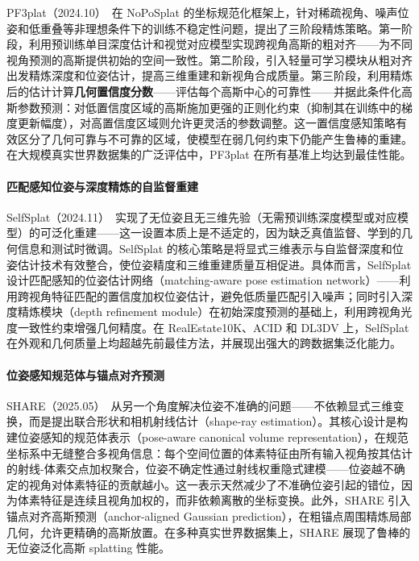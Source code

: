 PF3plat（2024.10）~\cite{2410_22128}在 NoPoSplat 的坐标规范化框架上，针对稀疏视角、噪声位姿和低重叠等非理想条件下的训练不稳定性问题，提出了三阶段精炼策略。第一阶段，利用预训练单目深度估计和视觉对应模型实现跨视角高斯的粗对齐——为不同视角预测的高斯提供初始的空间一致性。第二阶段，引入轻量可学习模块从粗对齐出发精炼深度和位姿估计，提高三维重建和新视角合成质量。第三阶段，利用精炼后的估计计算\textbf{几何置信度分数}——评估每个高斯中心的可靠性——并据此条件化高斯参数预测：对低置信度区域的高斯施加更强的正则化约束（抑制其在训练中的梯度更新幅度），对高置信度区域则允许更灵活的参数调整。这一置信度感知策略有效区分了几何可靠与不可靠的区域，使模型在弱几何约束下仍能产生鲁棒的重建。在大规模真实世界数据集的广泛评估中，PF3plat 在所有基准上均达到最佳性能。

\paragraph{匹配感知位姿与深度精炼的自监督重建}

SelfSplat（2024.11）~\cite{2411_17190}实现了无位姿且无三维先验（无需预训练深度模型或对应模型）的可泛化重建——这一设置本质上是不适定的，因为缺乏真值监督、学到的几何信息和测试时微调。SelfSplat 的核心策略是将显式三维表示与自监督深度和位姿估计技术有效整合，使位姿精度和三维重建质量互相促进。具体而言，SelfSplat 设计匹配感知的位姿估计网络（matching-aware pose estimation network）——利用跨视角特征匹配的置信度加权位姿估计，避免低质量匹配引入噪声；同时引入深度精炼模块（depth refinement module）在初始深度预测的基础上，利用跨视角光度一致性约束增强几何精度。在 RealEstate10K、ACID 和 DL3DV 上，SelfSplat 在外观和几何质量上均超越先前最佳方法，并展现出强大的跨数据集泛化能力。

\paragraph{位姿感知规范体与锚点对齐预测}

SHARE（2025.05）~\cite{2505_22978}从另一个角度解决位姿不准确的问题——不依赖显式三维变换，而是提出联合形状和相机射线估计（shape-ray estimation）。其核心设计是构建位姿感知的规范体表示（pose-aware canonical volume representation），在规范坐标系中无缝整合多视角信息：每个空间位置的体素特征由所有输入视角按其估计的射线-体素交点加权聚合，位姿不确定性通过射线权重隐式建模——位姿越不确定的视角对体素特征的贡献越小。这一表示天然减少了不准确位姿引起的错位，因为体素特征是连续且视角加权的，而非依赖离散的坐标变换。此外，SHARE 引入锚点对齐高斯预测（anchor-aligned Gaussian prediction），在粗锚点周围精炼局部几何，允许更精确的高斯放置。在多种真实世界数据集上，SHARE 展现了鲁棒的无位姿泛化高斯 splatting 性能。

